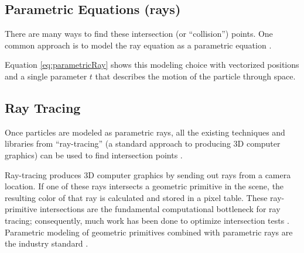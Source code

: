 	\subsection{Parametric Equations (rays)}

There are many ways to find these intersection (or ``collision'') points. One common approach is to model the ray equation as a parametric equation \cite{purcell2002ray}.


 {
	\label{eq:parametricRay}
}

Equation \eqref{eq:parametricRay} shows this modeling choice with vectorized positions and a single parameter $t$ that describes the motion of the particle through space.


	\subsection{Ray Tracing}

Once particles are modeled as parametric rays, all the existing techniques and libraries from ``ray-tracing'' (a standard approach to producing 3D computer graphics) can be used to find intersection points \cite{purcell2002ray}.

Ray-tracing produces 3D computer graphics by sending out rays from a camera location. If one of these rays intersects a geometric primitive in the scene, the resulting color of that ray is calculated and stored in a pixel table. These ray-primitive intersections are the fundamental computational bottleneck for ray tracing; consequently, much work has been done to optimize intersection tests \cite{purcell2002ray}. Parametric modeling of geometric primitives combined with parametric rays are the industry standard \cite{glassner1989introduction}.



